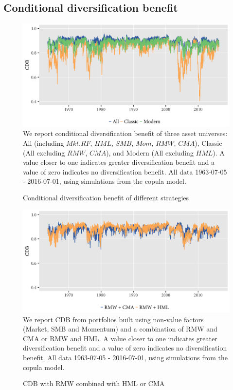 \subsection{Conditional diversification benefit}
\begin{figure}[H]
  \caption{Conditional diversification benefit of different strategies}
  \label{diag:cdb1}
  \toprule
  \centering
  \begin{minipage}{\textwidth}
  \includegraphics[width=\textwidth]{graphics/cdb--modern-classic.png}  
  \bottomrule
  \vspace{3mm}
  \footnotesize
  We report conditional diversification benefit of three asset universes: All (including $Mkt.RF$, $HML$, $SMB$, $Mom$, $RMW$, $CMA$), Classic (All excluding $RMW$, $CMA$), and Modern (All excluding $HML$). A value closer to one indicates greater diversification benefit and a value of zero indicates no diversification benefit. All data 1963-07-05 - 2016-07-01, using simulations from the copula model.
  \end{minipage}
\end{figure}

\begin{figure}[H]
  \caption{CDB with RMW combined with HML or CMA}
  \label{diag:cdb--rmw_cma-rmw_hml}
  \toprule
  \centering
  \begin{minipage}{\textwidth}
  \includegraphics[width=\textwidth]{graphics/cdb--rmw_cma-rmw_hml.png}  
  \bottomrule
  \vspace{3mm}
  \footnotesize
  We report CDB from portfolios built using non-value factors (Market, SMB and Momentum) and a combination of RMW and CMA or RMW and HML. A value closer to one indicates greater diversification benefit and a value of zero indicates no diversification benefit. All data 1963-07-05 - 2016-07-01, using simulations from the copula model.
  \end{minipage}
\end{figure}

